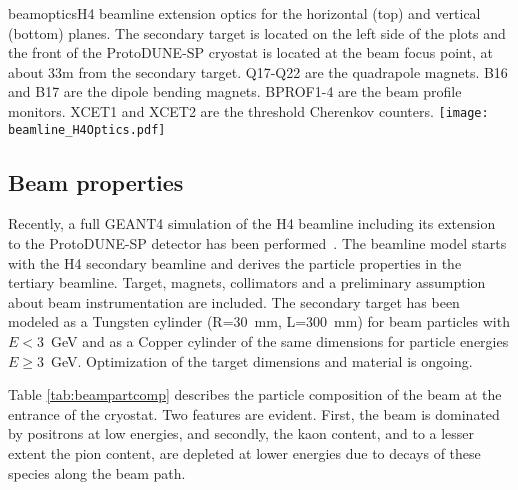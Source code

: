 \begin{cdrfigure}{beamoptics}{H4 beamline extension optics for the horizontal (top) and vertical (bottom) planes. The secondary target is located on the left side of the plots and the front of the ProtoDUNE-SP cryostat is located at the beam focus point, at about 33m from the secondary target. Q17-Q22 are the quadrapole magnets. B16 and B17 are the dipole bending magnets. BPROF1-4 are the beam profile monitors. XCET1 and XCET2 are the threshold Cherenkov counters. }
 \texttt{[image: beamline\_H4Optics.pdf]}
\end{cdrfigure}

\subsection{Beam properties}
Recently, a full GEANT4 simulation of the H4 beamline including its extension to the ProtoDUNE-SP detector %
has been performed~\cite{H4beamfiles}. 
The beamline model starts with the H4 secondary beamline 
and derives the particle properties in the tertiary beamline.  Target, magnets, collimators and a preliminary assumption
about beam instrumentation are included. The secondary target has been
modeled as a Tungsten cylinder (R=30~mm, L=300~mm) for beam particles with $E<3$~GeV and as a Copper cylinder of the same dimensions  for %
particle energies  $E\geqslant3$~GeV. Optimization of the target dimensions and material is ongoing.

Table \ref{tab:beampartcomp} describes the particle composition of the
beam at the entrance of the cryostat. Two features are evident. First, the beam is dominated by positrons at low energies,
and secondly, the kaon content, and to a lesser extent the pion content, are depleted at lower energies due to decays of these species 
along the beam path. 


